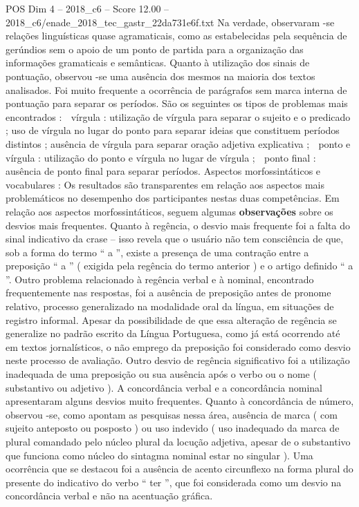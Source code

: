 \begin{textsample}{POS Dim 4 – 2018\_c6 – Score 12.00 – 2018\_c6/enade\_2018\_tec\_gastr\_22da731e6f.txt}
Na verdade, observaram -se relações linguísticas quase agramaticais, como as estabelecidas pela sequência de gerúndios sem o apoio de um ponto de partida para a organização das informações gramaticais e semânticas.
Quanto à utilização dos sinais de pontuação, observou -se uma ausência dos mesmos na maioria dos textos analisados.
Foi muito frequente a ocorrência de parágrafos sem marca interna de pontuação para separar os períodos.
São os seguintes os tipos de problemas mais encontrados :  vírgula : utilização de vírgula para separar o sujeito e o predicado ; uso de vírgula no lugar do ponto para separar ideias que constituem períodos distintos ; ausência de vírgula para separar oração adjetiva explicativa ;  ponto e vírgula : utilização do ponto e vírgula no lugar de vírgula ;  ponto final : ausência de ponto final para separar períodos.
Aspectos morfossintáticos e vocabulares : Os resultados são transparentes em relação aos aspectos mais problemáticos no desempenho dos participantes nestas duas competências.
Em relação aos aspectos morfossintáticos, seguem algumas \textbf{observações} sobre os desvios mais frequentes.
Quanto à regência, o desvio mais frequente foi a falta do sinal indicativo da crase – isso revela que o usuário não tem consciência de que, sob a forma do termo “ a ”, existe a presença de uma contração entre a preposição “ a ” ( exigida pela regência do termo anterior ) e o artigo definido “ a ”.
Outro problema relacionado à regência verbal e à nominal, encontrado frequentemente nas respostas, foi a ausência de preposição antes de pronome relativo, processo generalizado na modalidade oral da língua, em situações de registro informal.
Apesar da possibilidade de que essa alteração de regência se generalize no padrão escrito da Língua Portuguesa, como já está ocorrendo até em textos jornalísticos, o não emprego da preposição foi considerado como desvio neste processo de avaliação.
Outro desvio de regência significativo foi a utilização inadequada de uma preposição ou sua ausência após o verbo ou o nome ( substantivo ou adjetivo ).
A concordância verbal e a concordância nominal apresentaram alguns desvios muito frequentes.
Quanto à concordância de número, observou -se, como apontam as pesquisas nessa área, ausência de marca ( com sujeito anteposto ou posposto ) ou uso indevido ( uso inadequado da marca de plural comandado pelo núcleo plural da locução adjetiva, apesar de o substantivo que funciona como núcleo do sintagma nominal estar no singular ).
Uma ocorrência que se destacou foi a ausência de acento circunflexo na forma plural do presente do indicativo do verbo “ ter ”, que foi considerada como um desvio na concordância verbal e não na acentuação gráfica.

\end{textsample}
